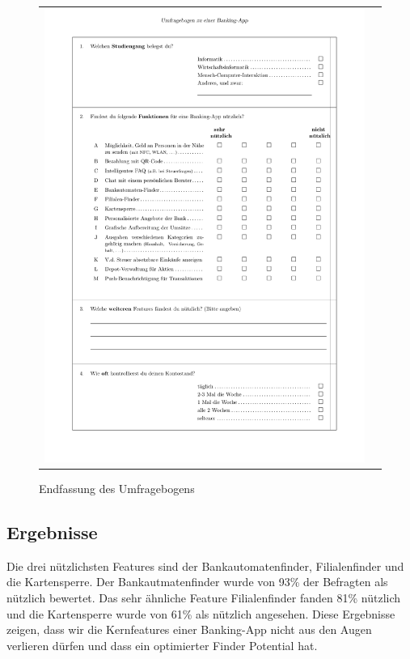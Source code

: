 \begin{figure}
\begin{tabular}{@{}cc@{}}
		\includegraphics[page=2, scale=.3]{Pictures/Questionnaire}
	\end{tabular}
	\caption{Endfassung des Umfragebogens \label{fig:Questionnaire}}
\end{figure}	
	
\subsection{Ergebnisse}
	Die drei nützlichsten Features sind der Bankautomatenfinder, Filialenfinder und die Kartensperre. Der Bankautmatenfinder wurde von 93\% der Befragten als nützlich bewertet. Das sehr ähnliche Feature Filialenfinder fanden 81\% nützlich und die Kartensperre wurde von 61\% als nützlich angesehen. Diese Ergebnisse zeigen, dass wir die Kernfeatures einer Banking-App nicht aus den Augen verlieren dürfen und dass ein optimierter Finder Potential hat.
	
